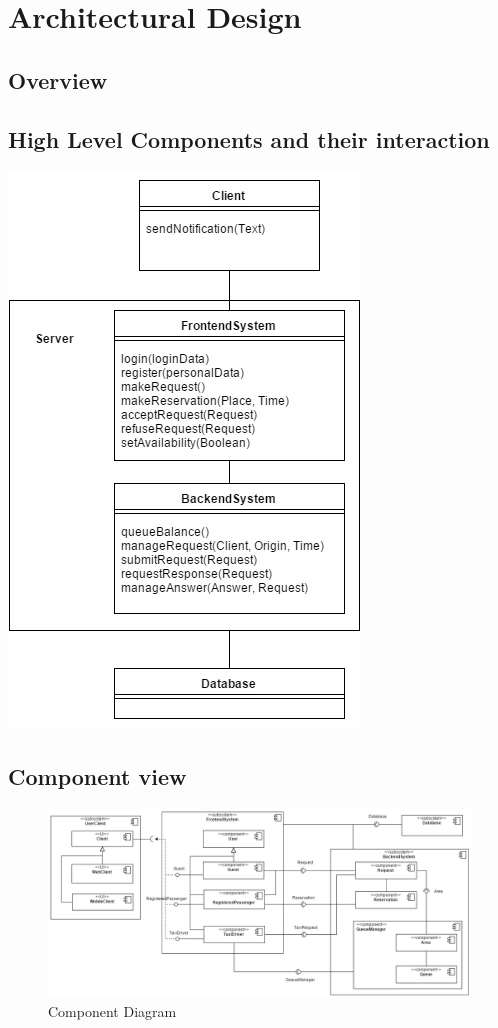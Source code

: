 \section{Architectural Design}
	\subsection{Overview}
	\subsection{High Level Components and their interaction}
	\includegraphics[scale=1]{../SE2_IMAGES/HLC}
	\newpage
	\begin{landscape}
	\subsection{Component view}
		\begin{figure}[h!]
			\begin{center}
				\includegraphics[width=0.9\linewidth]{../SE2_IMAGES/ComponentDiagram}
				\caption{Component Diagram}
			\end{center}
		\end{figure}
	\end{landscape}
